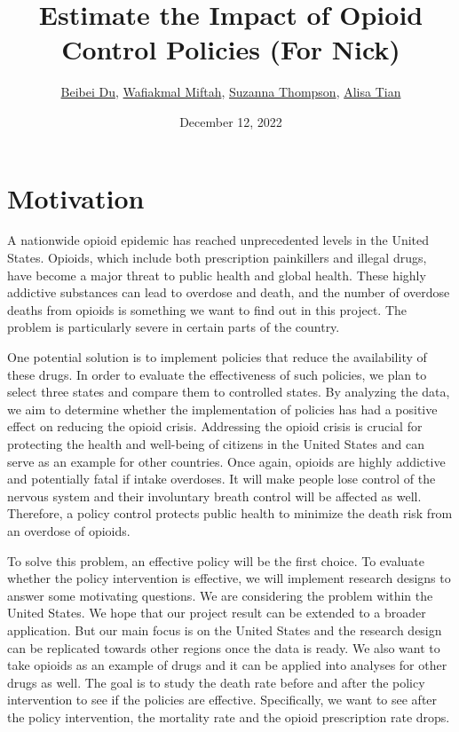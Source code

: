 \documentclass{article}
\title{Estimate the Impact of Opioid Control Policies (For Nick)
\\
}
\author{\href{mailto:beibei.du@duke.edu}{Beibei Du}, 
\href{mailto:wafiakmal.miftah@duke.edu}{Wafiakmal Miftah},
\href{mailto:suzanna.thompson@duke.edu}{Suzanna Thompson},
\href{mailto:alisa.tian@duke.edu}{Alisa Tian}
}
\date{December 12, 2022}
\begin{document}
\maketitle
\section{Motivation}

A nationwide opioid epidemic has reached unprecedented levels in the United States. Opioids, which include both prescription painkillers and illegal drugs, have become a major threat to public health and global health. These highly addictive substances can lead to overdose and death, and the number of overdose deaths from opioids is something we want to find out in this project. The problem is particularly severe in certain parts of the country.

One potential solution is to implement policies that reduce the availability of these drugs. In order to evaluate the effectiveness of such policies, we plan to select three states and compare them to controlled states. By analyzing the data, we aim to determine whether the implementation of policies has had a positive effect on reducing the opioid crisis. Addressing the opioid crisis is crucial for protecting the health and well-being of citizens in the United States and can serve as an example for other countries. Once again, opioids are highly addictive and
potentially fatal if intake overdoses. It will make people lose 
control of the nervous system and their involuntary breath control will
be affected as well. Therefore, a policy control protects public
health to minimize the death risk from an overdose of opioids.

To solve this problem, an effective policy will be the first choice. To
evaluate whether the policy intervention is effective, we will implement
research designs to answer some motivating questions. We are considering
the problem within the United States. We hope that our project result
can be extended to a broader application. But our main focus is on the
United States and the research design can be replicated towards other
regions once the data is ready. We also want to take opioids as an
example of drugs and it can be applied into analyses for other drugs as
well. The goal is to study the death rate before and after the policy
intervention to see if the policies are effective. Specifically, we want
to see after the policy intervention, the mortality rate and the opioid
prescription rate drops.
\end{document}
